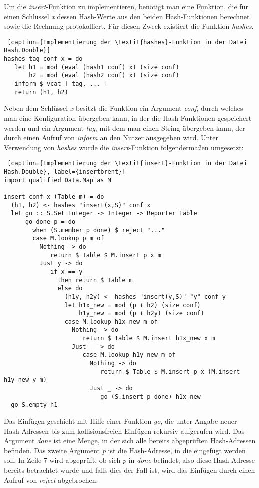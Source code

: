 Um die \textit{insert}-Funktion zu implementieren, benötigt man eine Funktion, die für einen Schlüssel \textit{x} dessen Hash-Werte aus den beiden Hash-Funktionen berechnet sowie die Rechnung protokolliert. 
\newpage
Für diesen Zweck existiert die Funktion \textit{hashes}. 
\begin{lstlisting} [caption={Implementierung der \textit{hashes}-Funktion in der Datei Hash.Double}]
hashes tag conf x = do
   let h1 = mod (eval (hash1 conf) x) (size conf)
       h2 = mod (eval (hash2 conf) x) (size conf)
   inform $ vcat [ tag, ... ]
   return (h1, h2)
\end{lstlisting}
Neben dem Schlüssel \textit{x} besitzt die Funktion ein Argument \textit{conf}, durch welches man eine Konfiguration übergeben kann, in der die Hash-Funktionen gespeichert werden und ein Argument \textit{tag}, mit dem man einen String übergeben kann, der durch einen Aufruf von \textit{inform} an den Nutzer ausgegeben wird. 
\newpage
Unter Verwendung von \textit{hashes} wurde die \textit{insert}-Funktion folgendermaßen umgesetzt:
\begin{lstlisting} [caption={Implementierung der \textit{insert}-Funktion in der Datei Hash.Double}, label={insertbrent}]
import qualified Data.Map as M

insert conf x (Table m) = do
  (h1, h2) <- hashes "insert(x,S)" conf x
  let go :: S.Set Integer -> Integer -> Reporter Table
      go done p = do
        when (S.member p done) $ reject "..."
        case M.lookup p m of
          Nothing -> do
             return $ Table $ M.insert p x m
          Just y -> do
             if x == y
               then return $ Table m
               else do
                 (h1y, h2y) <- hashes "insert(y,S)" "y" conf y
                 let h1x_new = mod (p + h2) (size conf)
                     h1y_new = mod (p + h2y) (size conf)
                 case M.lookup h1x_new m of
                   Nothing -> do
                      return $ Table $ M.insert h1x_new x m
                   Just _ -> do
                      case M.lookup h1y_new m of
                        Nothing -> do
                           return $ Table $ M.insert p x (M.insert h1y_new y m)
                        Just _ -> do
                           go (S.insert p done) h1x_new
  go S.empty h1
\end{lstlisting}
Das Einfügen geschieht mit Hilfe einer Funktion \textit{go}, die unter Angabe neuer Hash-Adressen bis zum kollisionsfreien Einfügen rekursiv aufgerufen wird. Das Argument \textit{done} ist eine Menge, in der sich alle bereits abgeprüften Hash-Adressen befinden. Das zweite Argument \textit{p} ist die Hash-Adresse, in die eingefügt werden soll. In Zeile 7 wird abgeprüft, ob sich \textit{p} in \textit{done} befindet, also diese Hash-Adresse bereits betrachtet wurde und falls dies der Fall ist, wird das Einfügen durch einen Aufruf von \textit{reject} abgebrochen. 

